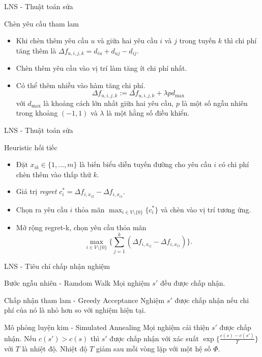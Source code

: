 \begin{frame}{LNS - Thuật toán sửa}
  \begin{block}{Chèn yêu cầu tham lam}
    \begin{itemize}
      \item Khi chèn thêm yêu cầu $u$ và giữa hai yêu cầu $i$ và $j$ trong tuyến $k$ thì chi phí tăng thêm là $\Delta f_{u, i, j, k} = d_{iu} + d_{uj} - d_{ij}$.
      \item Chèn thêm yêu cầu vào vị trí làm tăng ít chi phí nhất.
      \item Có thể thêm nhiễu vào hàm tăng chi phí.
      \begin{equation}
        \Delta f_{u, i, j, k} := \Delta f_{u, i, j, k} + \lambda p d_{\text{max}}
      \end{equation}
      với $d_{\text{max}}$ là khoảng cách lớn nhất giữa hai yêu cầu, $p$ là một số ngẫu nhiên trong khoảng $(-1,1)$ và $\lambda$ là một hằng số điều khiển.
    \end{itemize}
  \end{block}
\end{frame}

\begin{frame}{LNS - Thuật toán sửa}
  \begin{block}{Heuristic hối tiếc}
    \begin{itemize}
      \item Đặt $x_{ik} \in \{1, ..., m\}$ là biến biểu diễn tuyến đường cho yêu cầu $i$ có chi phí chèn thêm vào thấp thứ $k$.
      \item Giá trị \textit{regret} $c_i^* = \Delta f_{i, x_{i2}} - \Delta f_{i, x_{i1}}$.
      \item Chọn ra yêu cầu $i$ thỏa mãn $\max_{i \in V \setminus \{0\}} \{c_i^*\}$ và chèn vào vị trí tương ứng.
      \item Mở rộng regret-k, chọn yêu cầu thỏa mãn
      \begin{equation}
        \max\limits_{i \in V \setminus \{0\} } \{ \sum_{j=1}^k (\Delta f_{i, x_{ij}} - \Delta f_{i, x_{i1}}) \}.
    \end{equation}
    \end{itemize}
  \end{block}
\end{frame}

\begin{frame}{LNS - Tiêu chí chấp nhận nghiệm}
    \begin{block}{Bước ngẫu nhiên - Ramdom Walk}
      Mọi nghiệm $s'$ đều được chấp nhận.
    \end{block}
    \begin{block}{Chấp nhận tham lam - Greedy Acceptance}
      Nghiệm $s'$ được chấp nhận nếu chi phí của nó là nhỏ hơn so với nghiệm hiện tại.
    \end{block}
    \begin{block}{Mô phỏng luyện kim - Simulated Annealing}
      Mọi nghiệm cải thiện $s'$ được chấp nhận. Nếu $c(s') > c(s)$ thì $s'$ được chấp nhận với xác suất $\exp \{ \frac{c(s) - c(s')}{T} \}$ với $T$ là nhiệt độ. Nhiệt độ $T$ giảm sau mỗi vòng lặp với một hệ số $\Phi$.
    \end{block}
\end{frame}

